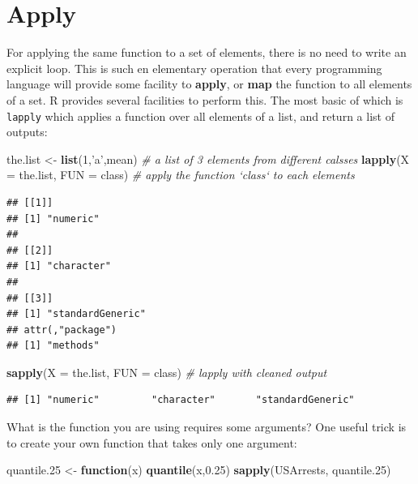\documentclass[]{book}
\newenvironment{Shaded}{\begin{snugshade}}{\end{snugshade}}
\newcommand{\KeywordTok}[1]{\textcolor[rgb]{0.13,0.29,0.53}{\textbf{#1}}}
\newcommand{\DataTypeTok}[1]{\textcolor[rgb]{0.13,0.29,0.53}{#1}}
\newcommand{\DecValTok}[1]{\textcolor[rgb]{0.00,0.00,0.81}{#1}}
\newcommand{\FloatTok}[1]{\textcolor[rgb]{0.00,0.00,0.81}{#1}}
\newcommand{\StringTok}[1]{\textcolor[rgb]{0.31,0.60,0.02}{#1}}
\newcommand{\CommentTok}[1]{\textcolor[rgb]{0.56,0.35,0.01}{\textit{#1}}}
\newcommand{\ControlFlowTok}[1]{\textcolor[rgb]{0.13,0.29,0.53}{\textbf{#1}}}
\newcommand{\NormalTok}[1]{#1}
\theoremstyle{definition}
\theoremstyle{definition}
\theoremstyle{definition}
\theoremstyle{remark}
\begin{document}
\section{Apply}\label{apply}

For applying the same function to a set of elements, there is no need to
write an explicit loop. This is such en elementary operation that every
programming language will provide some facility to \textbf{apply}, or
\textbf{map} the function to all elements of a set. R provides several
facilities to perform this. The most basic of which is \texttt{lapply}
which applies a function over all elements of a list, and return a list
of outputs:

\begin{Shaded}
\begin{Highlighting}[]
\NormalTok{the.list <-}\StringTok{ }\KeywordTok{list}\NormalTok{(}\DecValTok{1}\NormalTok{,}\StringTok{'a'}\NormalTok{,mean) }\CommentTok{# a list of 3 elements from different calsses}
\KeywordTok{lapply}\NormalTok{(}\DataTypeTok{X =}\NormalTok{ the.list, }\DataTypeTok{FUN =}\NormalTok{ class) }\CommentTok{# apply the function `class` to each elements}
\end{Highlighting}
\end{Shaded}

\begin{verbatim}
## [[1]]
## [1] "numeric"
## 
## [[2]]
## [1] "character"
## 
## [[3]]
## [1] "standardGeneric"
## attr(,"package")
## [1] "methods"
\end{verbatim}

\begin{Shaded}
\begin{Highlighting}[]
\KeywordTok{sapply}\NormalTok{(}\DataTypeTok{X =}\NormalTok{ the.list, }\DataTypeTok{FUN =}\NormalTok{ class) }\CommentTok{# lapply with cleaned output}
\end{Highlighting}
\end{Shaded}

\begin{verbatim}
## [1] "numeric"         "character"       "standardGeneric"
\end{verbatim}

What is the function you are using requires some arguments? One useful
trick is to create your own function that takes only one argument:

\begin{Shaded}
\begin{Highlighting}[]
\NormalTok{quantile.}\DecValTok{25}\NormalTok{ <-}\StringTok{ }\ControlFlowTok{function}\NormalTok{(x) }\KeywordTok{quantile}\NormalTok{(x,}\FloatTok{0.25}\NormalTok{)}
\KeywordTok{sapply}\NormalTok{(USArrests, quantile.}\DecValTok{25}\NormalTok{)}
\end{Highlighting}
\end{Shaded}
\end{document}
